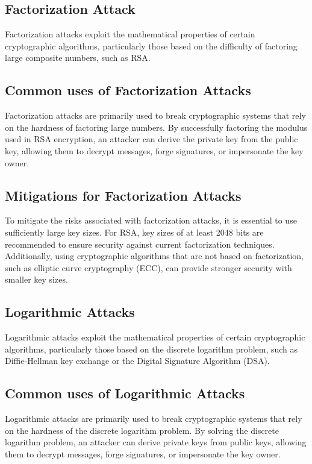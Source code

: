 \begin{center}
    \section{Factorization Attack}
\end{center}
Factorization attacks exploit the mathematical properties of certain cryptographic algorithms, particularly those based on the difficulty of factoring large composite numbers, such as RSA.

\subsection*{Common uses of Factorization Attacks}
Factorization attacks are primarily used to break cryptographic systems that rely on the hardness of factoring large numbers. By successfully factoring the modulus used in RSA encryption, an attacker can derive the private key from the public key, allowing them to decrypt messages, forge signatures, or impersonate the key owner.

\subsection*{Mitigations for Factorization Attacks}
To mitigate the risks associated with factorization attacks, it is essential to use sufficiently large key sizes. For RSA, key sizes of at least 2048 bits are recommended to ensure security against current factorization techniques. Additionally, using cryptographic algorithms that are not based on factorization, such as elliptic curve cryptography (ECC), can provide stronger security with smaller key sizes.

\begin{center}
    \section{Logarithmic Attacks}
\end{center}
Logarithmic attacks exploit the mathematical properties of certain cryptographic algorithms, particularly those based on the discrete logarithm problem, such as Diffie-Hellman key exchange or the Digital Signature Algorithm (DSA).

\subsection*{Common uses of Logarithmic Attacks}
Logarithmic attacks are primarily used to break cryptographic systems that rely on the hardness of the discrete logarithm problem. By solving the discrete logarithm problem, an attacker can derive private keys from public keys, allowing them to decrypt messages, forge signatures, or impersonate the key owner.

